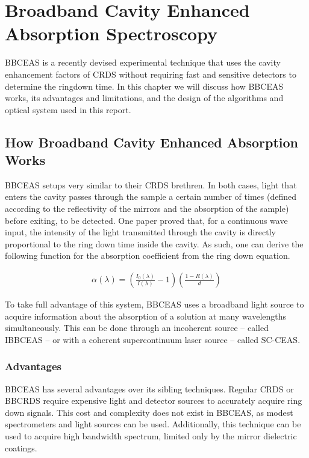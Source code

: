 \chapter{Broadband Cavity Enhanced Absorption Spectroscopy}


\ac{BBCEAS} is a recently devised experimental technique that uses the
cavity enhancement factors of \ac{CRDS} without requiring fast and sensitive
detectors to determine the ringdown time. In this chapter we will discuss
how \ac{BBCEAS} works, its advantages and limitations, and the design of the
algorithms and optical system used in this report.


\section{How Broadband Cavity Enhanced Absorption Works}

\acl{BBCEAS} setups very similar to their \ac{CRDS} brethren. In both
cases, light that enters the cavity passes through the sample a certain number
of times (defined according to the reflectivity of the mirrors and the
absorption of the sample) before exiting, to be detected. One
paper proved that,
for a continuous wave input, the intensity of the light transmitted through
the cavity is directly proportional to the ring down time inside the cavity.
As such, one can derive the following function for the absorption coefficient
from the ring down equation.

  \begin{align}
    \alpha(\lambda) =
    \left(\frac{I_0(\lambda)}{I(\lambda)}-1\right)\left(\frac{1-R(\lambda)}{d}\right)
  \end{align}

To take full advantage of this system, \ac{BBCEAS} uses a broadband light
source to acquire information about the absorption of a solution at many
wavelengths simultaneously. This can be done through an incoherent source
-- called \ac{IBBCEAS} -- or with a coherent supercontinuum laser
source -- called \ac{SC-CEAS}.

\subsection{Advantages}

\acl{BBCEAS} has several advantages over its sibling techniques. Regular
\ac{CRDS} or \ac{BBCRDS} require expensive light and detector sources to
accurately acquire ring down signals. This cost and complexity does not
exist in \ac{BBCEAS}, as modest spectrometers and light sources can be used.
Additionally, this technique can be used to acquire high bandwidth spectrum,
limited only by the mirror dielectric coatings.

